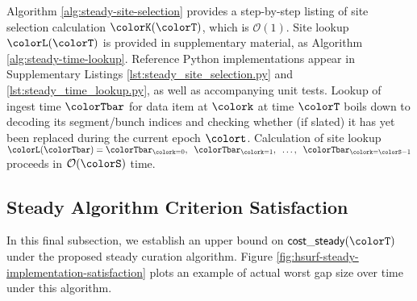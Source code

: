 

Algorithm \ref{alg:steady-site-selection} provides a step-by-step listing of site selection calculation $\colorK(\colorT)$, which is $\mathcal{O}(1)$.
Site lookup $\colorL(\colorT)$ is provided in supplementary material, as Algorithm \ref{alg:steady-time-lookup}.
Reference Python implementations appear in Supplementary Listings \ref{lst:steady_site_selection.py} and \ref{lst:steady_time_lookup.py}, as well as accompanying unit tests.
Lookup of ingest time $\colorTbar$ for data item at $\colork$ at time $\colorT$ boils down to decoding its segment/bunch indices and checking whether (if slated) it has yet been replaced during the current epoch $\colort$.
Calculation of site lookup $\colorL(\colorTbar) = \colorTbar_{\colork=0},\;\; \colorTbar_{\colork=1},\;\; \ldots,\;\; \colorTbar_{\colork=\colorS-1}$ proceeds in $\mathcal{O}(\colorS)$ time.

\subsection{Steady Algorithm Criterion Satisfaction}
\label{sec:stready-satisfaction}

In this final subsection, we establish an upper bound on $\mathsf{cost\_steady}(\colorT)$ under the proposed steady curation algorithm.
Figure \ref{fig:hsurf-steady-implementation-satisfaction} plots an example of actual worst gap size over time under this algorithm.


